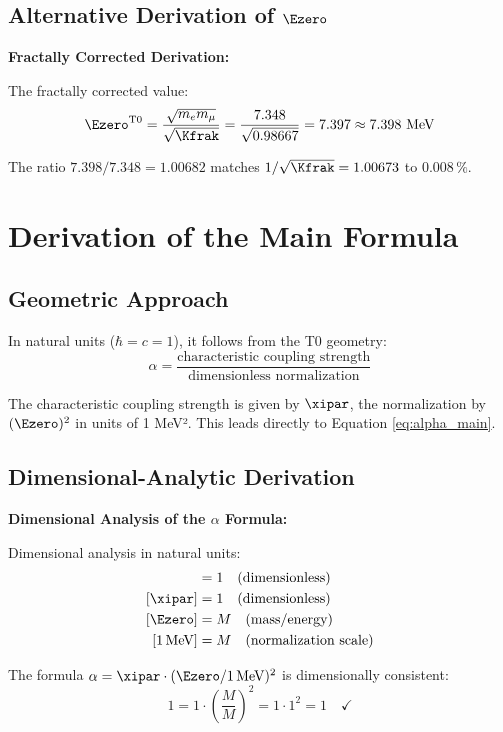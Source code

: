	\subsection{Alternative Derivation of $\Ezero$}
	
	\begin{alternative}
		\textbf{Fractally Corrected Derivation:}
		
		The fractally corrected value:
		\begin{equation}
			\Ezero^{\text{T0}} = \frac{\sqrt{m_e m_\mu}}{\sqrt{\Kfrak}} = \frac{7.348}{\sqrt{0.98667}} = 7.397 \approx 7.398 \text{ MeV}
		\end{equation}

		The ratio $7.398/7.348 = 1.00682$ matches $1/\sqrt{\Kfrak} = 1.00673$ to $0.008\,\%$.

	\end{alternative}
	
	\section{Derivation of the Main Formula}
	
	\subsection{Geometric Approach}
	
	In natural units ($\hbar = c = 1$), it follows from the T0 geometry:
	\begin{equation}
		\alpha = \frac{\text{characteristic coupling strength}}{\text{dimensionless normalization}}
		\label{eq:alpha_geometric}
	\end{equation}
	
	The characteristic coupling strength is given by $\xipar$, the normalization by $(\Ezero)^2$ in units of 1 MeV². This leads directly to Equation \eqref{eq:alpha_main}.
	
	\subsection{Dimensional-Analytic Derivation}
	
	\begin{foundation}
		\textbf{Dimensional Analysis of the $\alpha$ Formula:}
		
		Dimensional analysis in natural units:
		\begin{align}
			[\alpha] &= 1 \quad \text{(dimensionless)}\\
			[\xipar] &= 1 \quad \text{(dimensionless)}\\
			[\Ezero] &= M \quad \text{(mass/energy)}\\
			[1\,\text{MeV}] &= M \quad \text{(normalization scale)}
		\end{align}
		
		The formula $\alpha = \xipar \cdot (\Ezero/1\,\text{MeV})^2$ is dimensionally consistent:
		\begin{equation}
			1 = 1 \cdot \left(\frac{M}{M}\right)^2 = 1 \cdot 1^2 = 1 \quad \checkmark
		\end{equation}
	\end{foundation}
	
